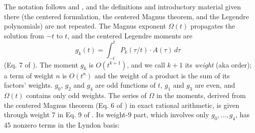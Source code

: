 \documentclass[12pt]{article}
\begin{document}
The notation follows \cite{jtut} and \cite{j28}, and the definitions and introductory material given there (the centered formulation, the centered Magnus theorem, and the Legendre polynomials) are not repeated. The Magnus exponent $\Omega(t)$ propagates the solution from $-t$ to $t$, and the centered Legendre moments are
\begin{equation}
g_{k}(t)=\int_{-t}^{t}P_{k}(\tau/t)\cdot A(\tau)\,d\tau\label{eq:gdef}
\end{equation}
(Eq. 7 of \cite{j28}). The moment $g_k$ is $O(t^{k+1})$, and we call $k+1$ its \emph{weight} (aka order); a term of weight $n$ is $O(t^n)$ and the weight of a product is the sum of its factors' weights. $g_0$, $g_2$ and $g_4$ are odd functions of $t$, $g_1$ and $g_3$ are even, and $\Omega(t)$ contains only odd weights. The series of $\Omega$ in the moments, derived from the centered Magnus theorem (Eq. 6 of \cite{j28}) in exact rational arithmetic, is given through weight 7 in Eq. 9 of \cite{j28}. Its weight-9 part, which involves only $g_0,\ldots,g_4$, has 45 nonzero terms in the Lyndon basis:
\end{document}
